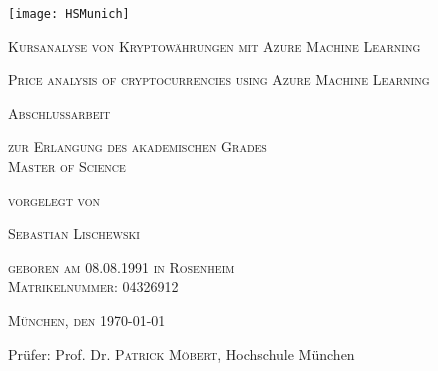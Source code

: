 \begin{titlepage}
	\centering
	\texttt{[image: HSMunich]}\par
	{\scshape\LARGE Kursanalyse von Kryptowährungen mit Azure Machine Learning \par}
	\vspace{0.3cm}
	{\scshape\large Price analysis of cryptocurrencies using Azure Machine Learning \par}
	{\scshape\Large Abschlussarbeit\par}
	\vspace{0.3cm}
	{\scshape\small zur Erlangung des akademischen Grades \\Master of Science\par}
	\vspace{0.2cm}
	{\scshape\small vorgelegt von\par}
	{\scshape\Large Sebastian Lischewski\par}
	\vspace{0.2cm}
	{\scshape\small geboren am 08.08.1991 in Rosenheim\\ Matrikelnummer: 04326912\par}
	\vspace{0.2cm}
	{\scshape\small München, den \today \par}
	\vfill
	Prüfer: Prof. Dr. \textsc{Patrick Möbert}, Hochschule München\par

	\vfill
\end{titlepage}